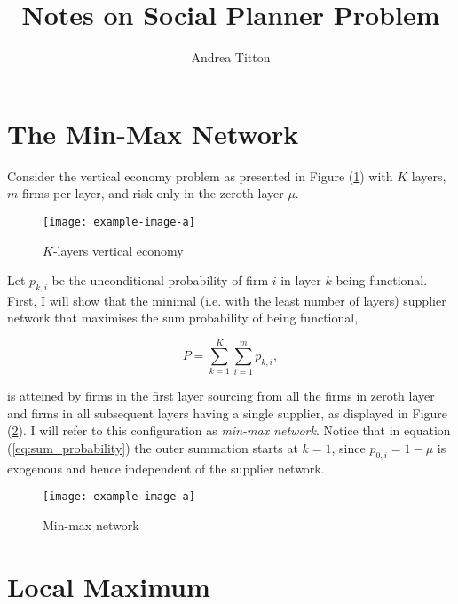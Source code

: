 \documentclass[american, abstract=on]{scrartcl}
\author{Andrea Titton}
\title{Notes on Social Planner Problem}
\newcommand{\inputTikZ}[2]{\scalebox{#1}{}}
\theoremstyle{plain}
\begin{document}
\maketitle

\section{The Min-Max Network}

Consider the vertical economy problem as presented in Figure (\ref{fig:vertical-economy-diagram}) with $K$ layers, $m$ firms per layer, and risk only in the zeroth layer $\mu$.

\begin{figure}[H]
    \centering
    \texttt{[image: example-image-a]}
    \caption{$K$-layers vertical economy}
    \label{fig:vertical-economy-diagram}
\end{figure}

Let $p_{k, i}$ be the unconditional probability of firm $i$ in layer $k$ being functional. First, I will show that the minimal (i.e. with the least number of layers) supplier network that maximises the sum probability of being functional,

\begin{equation} \label{eq:sum_probability}
    P = \sum^{K}_{k = 1} \sum^m_{i = 1} p_{k, i},
\end{equation}

is atteined by firms in the first layer sourcing from all the firms in zeroth layer and firms in all subsequent layers having a single supplier, as displayed in Figure (\ref{fig:maximal-probability-diagram}). I will refer to this configuration as \textit{min-max network}. Notice that in equation (\ref{eq:sum_probability}) the outer summation starts at $k = 1$, since $p_{0, i} = 1 - \mu$ is exogenous and hence independent of the supplier network.

\begin{figure}[H]
    \centering
    \texttt{[image: example-image-a]}
    \caption{Min-max network} \label{fig:maximal-probability-diagram}
\end{figure}

\section{Local Maximum}
\end{document}
